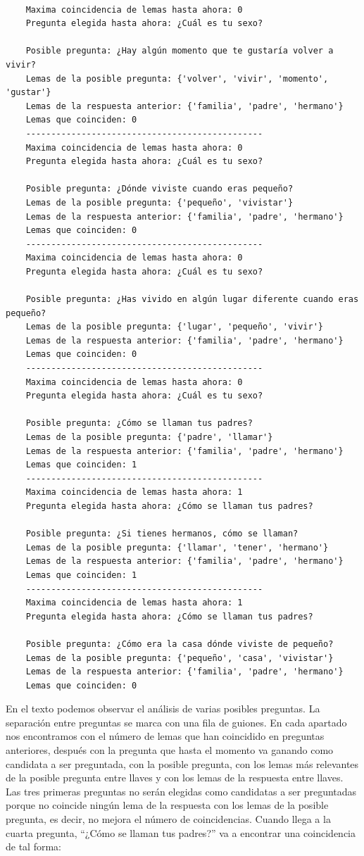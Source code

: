 \begin{verbatim}
	
	Maxima coincidencia de lemas hasta ahora: 0
	Pregunta elegida hasta ahora: ¿Cuál es tu sexo?
	
	Posible pregunta: ¿Hay algún momento que te gustaría volver a vivir?
	Lemas de la posible pregunta: {'volver', 'vivir', 'momento', 'gustar'}
	Lemas de la respuesta anterior: {'familia', 'padre', 'hermano'}
	Lemas que coinciden: 0
	-----------------------------------------------
	Maxima coincidencia de lemas hasta ahora: 0
	Pregunta elegida hasta ahora: ¿Cuál es tu sexo?
	
	Posible pregunta: ¿Dónde viviste cuando eras pequeño?
	Lemas de la posible pregunta: {'pequeño', 'vivistar'}
	Lemas de la respuesta anterior: {'familia', 'padre', 'hermano'}
	Lemas que coinciden: 0
	-----------------------------------------------
	Maxima coincidencia de lemas hasta ahora: 0
	Pregunta elegida hasta ahora: ¿Cuál es tu sexo?
	
	Posible pregunta: ¿Has vivido en algún lugar diferente cuando eras pequeño?
	Lemas de la posible pregunta: {'lugar', 'pequeño', 'vivir'}
	Lemas de la respuesta anterior: {'familia', 'padre', 'hermano'}
	Lemas que coinciden: 0
	-----------------------------------------------
	Maxima coincidencia de lemas hasta ahora: 0
	Pregunta elegida hasta ahora: ¿Cuál es tu sexo?
	
	Posible pregunta: ¿Cómo se llaman tus padres?
	Lemas de la posible pregunta: {'padre', 'llamar'}
	Lemas de la respuesta anterior: {'familia', 'padre', 'hermano'}
	Lemas que coinciden: 1
	-----------------------------------------------
	Maxima coincidencia de lemas hasta ahora: 1
	Pregunta elegida hasta ahora: ¿Cómo se llaman tus padres?
	
	Posible pregunta: ¿Si tienes hermanos, cómo se llaman?
	Lemas de la posible pregunta: {'llamar', 'tener', 'hermano'}
	Lemas de la respuesta anterior: {'familia', 'padre', 'hermano'}
	Lemas que coinciden: 1
	-----------------------------------------------
	Maxima coincidencia de lemas hasta ahora: 1
	Pregunta elegida hasta ahora: ¿Cómo se llaman tus padres?
	
	Posible pregunta: ¿Cómo era la casa dónde viviste de pequeño?
	Lemas de la posible pregunta: {'pequeño', 'casa', 'vivistar'}
	Lemas de la respuesta anterior: {'familia', 'padre', 'hermano'}
	Lemas que coinciden: 0
\end{verbatim}


En el texto podemos observar el análisis de varias posibles preguntas. La separación entre preguntas se marca con una fila de guiones. En cada apartado nos encontramos con el número de lemas que han coincidido en preguntas anteriores, después con la pregunta que hasta el momento va ganando como candidata a ser preguntada, con la posible pregunta, con los lemas más relevantes de la posible pregunta entre llaves y con los lemas de la respuesta entre llaves. Las tres primeras preguntas no serán elegidas como candidatas a ser preguntadas porque no coincide ningún lema de la respuesta con los lemas de la posible pregunta, es decir, no mejora el número de coincidencias. Cuando llega a la cuarta pregunta, ``¿Cómo se llaman tus padres?'' va a encontrar una coincidencia de tal forma:

